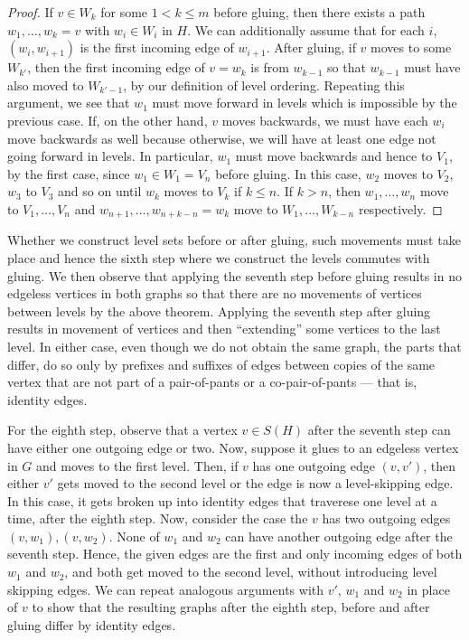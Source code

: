 \documentclass{amsart}
\newcommand{\li}[1][]{\ifthenelse{\equal{#1}{}}{\item}{\item \label{#1}}}
\newenvironment{enmrt}{
  \enumerate[(i)]
  \setlength{\itemsep}{0pt}
}{
  \endenumerate
}
\numberwithin{thm}{section}
\theoremstyle{definition}
\begin{document}
\begin{proof}
\begin{enmrt}
\li If $v \in W_k$ for some $1 < k \leq m$ before gluing, then there exists a
path $w_1, \dots, w_k = v$ with $w_i \in W_i$ in $H$. We can additionally assume
that for each $i$, $(w_i, w_{i + 1})$ is the first incoming edge of $w_{i + 1}$.
After gluing, if $v$ moves to some $W_{k'}$, then the first incoming edge of
$v = w_k$ is from $w_{k - 1}$ so that $w_{k - 1}$ must have also moved to
$W_{k' - 1}$, by our definition of level ordering. Repeating this argument, we
see that $w_1$ must move forward in levels which is impossible by the previous
case. If, on the other hand, $v$ moves backwards, we must have each $w_i$ move
backwards as well because otherwise, we will have at least one edge not going
forward in levels. In particular, $w_1$ must move backwards and hence to $V_1$,
by the first case, since $w_1 \in W_1 = V_n$ before gluing.
In this case, $w_2$ moves to $V_2$, $w_3$ to $V_3$ and so on until $w_k$ moves
to $V_k$ if $k \leq n$. If $k > n$, then $w_1, \dots, w_n$ move to
$V_1, \dots, V_n$ and $w_{n + 1}, \dots, w_{n + k - n} = w_k$ move to
$W_1, \dots, W_{k - n}$ respectively.
\end{enmrt}
\end{proof}

Whether we construct level sets before or after gluing, such movements must take
place and hence the sixth step where we construct the levels commutes with
gluing. We then observe that applying the seventh step before gluing results in
no edgeless vertices in both graphs so that there are no movements of vertices
between levels by the above theorem. Applying the seventh step after gluing
results in movement of vertices and then ``extending'' some vertices to the last
level. In either case, even though we do not obtain the same graph, the parts
that differ, do so only by prefixes and suffixes of edges between copies of the
same vertex that are not part of a pair-of-pants or a co-pair-of-pants --- that
is, identity edges.

For the eighth step, observe that a vertex $v \in S(H)$ after the seventh step
can have either one outgoing edge or two. Now, suppose it glues to an edgeless
vertex in $G$ and moves to the first level. Then, if $v$ has one outgoing edge
$(v, v')$, then either $v'$ gets moved to the second level or the edge is now
a level-skipping edge. In this case, it gets broken up into identity edges
that traverese one level at a time, after the eighth step.
Now, consider the case the $v$ has two outgoing edges $(v, w_1), (v, w_2)$.
None of $w_1$ and $w_2$ can have another outgoing edge after the seventh step.
Hence, the given edges are the first and only incoming edges of both $w_1$ and
$w_2$, and both get moved to the second level, without introducing level
skipping edges. We can repeat analogous arguments with $v'$, $w_1$ and $w_2$ in
place of $v$ to show that the resulting graphs after the eighth step, before and
after gluing differ by identity edges.
\end{document}
